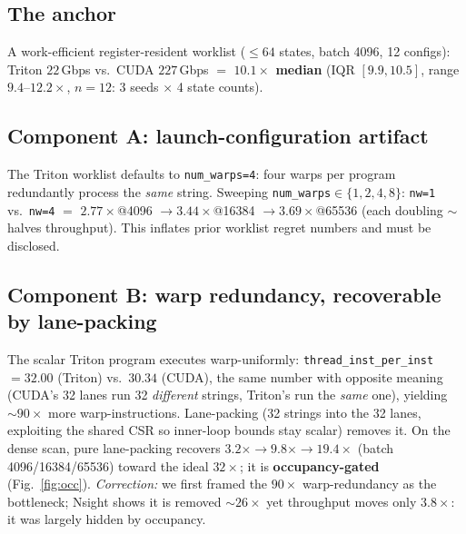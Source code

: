 \documentclass[sigplan,review,anonymous,10pt]{acmart}
\begin{document}
\subsection{The anchor}
A work-efficient register-resident worklist ($\le 64$ states, batch 4096, 12 configs): Triton
$22$\,Gbps vs.\ CUDA $227$\,Gbps $=$ \textbf{$10.1\times$ median} (IQR $[9.9, 10.5]$, range $9.4$--$12.2\times$, $n{=}12$: 3 seeds $\times$ 4 state counts).

\subsection{Component A: launch-configuration artifact}\label{sec:artifact}
The Triton worklist defaults to \texttt{num\_warps=4}: four warps per program redundantly process the
\emph{same} string. Sweeping \texttt{num\_warps}$\in\{1,2,4,8\}$: \texttt{nw=1} vs.\ \texttt{nw=4} $=$
$2.77\times$@4096 $\rightarrow 3.44\times$@16384 $\rightarrow 3.69\times$@65536 (each doubling
${\sim}$halves throughput). This inflates prior worklist regret numbers and must be disclosed.

\subsection{Component B: warp redundancy, recoverable by lane-packing}
The scalar Triton program executes warp-uniformly: \texttt{thread\_inst\_per\_inst} $=32.00$ (Triton)
vs.\ $30.34$ (CUDA), the same number with opposite meaning (CUDA's 32 lanes run 32 \emph{different}
strings, Triton's run the \emph{same} one), yielding ${\sim}90\times$ more warp-instructions. Lane-packing
(32 strings into the 32 lanes, exploiting the shared CSR so inner-loop bounds stay scalar) removes it.
On the dense scan, pure lane-packing recovers $3.2\times \rightarrow 9.8\times \rightarrow 19.4\times$
(batch 4096/16384/65536) toward the ideal $32\times$; it is \textbf{occupancy-gated}
(Fig.~\ref{fig:occ}). \emph{Correction:} we first framed the $90\times$ warp-redundancy as the
bottleneck; Nsight shows it is removed ${\sim}26\times$ yet throughput moves only $3.8\times$: it was
largely hidden by occupancy.
\end{document}
